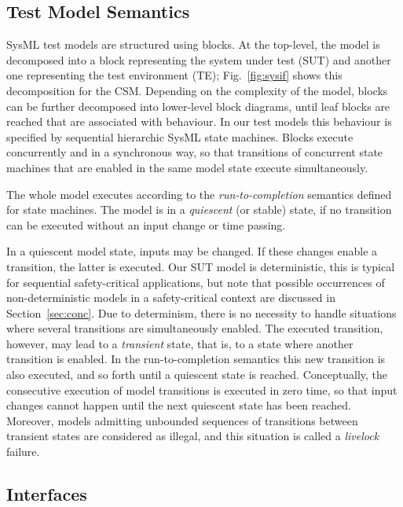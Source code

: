 \subsection{Test Model Semantics}\label{sec:bsem} 
SysML test models are structured using blocks. At the top-level, the
model is decomposed into a block representing the system under test
(SUT) and another one representing the test environment (TE);
Fig.~\ref{fig:sysif} shows this decomposition for the CSM.  Depending
on the complexity of the model, blocks can be further decomposed into
lower-level block diagrams, until leaf blocks are reached that are
associated with behaviour. In our test models this behaviour is
specified by sequential hierarchic SysML state machines. Blocks
execute concurrently and in a synchronous way, so that transitions of
concurrent state machines that are enabled in the same model state
execute simultaneously.

The whole model executes according to the {\it run-to-completion}
semantics defined for state machines. The model is in a {\it
  quiescent} (or stable) state, if no transition can be executed
without an input change or time passing.

 
In a quiescent model state, inputs may be changed.  If these changes
enable a transition, the latter is executed. Our SUT model is
deterministic, this is typical for sequential safety-critical
applications, but note that possible occurrences of non-deterministic models in 
a safety-critical context are discussed in Section~\ref{sec:conc}.
Due to determinism, there is no necessity to handle situations where
several transitions are simultaneously enabled.  The executed
transition, however, may lead to a {\it transient} state, that is, to
a state where another transition is enabled. In the run-to-completion
semantics this new transition is also executed, and so forth until a
quiescent state is reached. Conceptually, the consecutive execution of
model transitions is executed in zero time, so that input changes
cannot happen until the next quiescent state has been reached.
Moreover, models admitting unbounded sequences of transitions between
transient states are considered as illegal, and this situation is
called a {\it livelock} failure.


\subsection{Interfaces}


